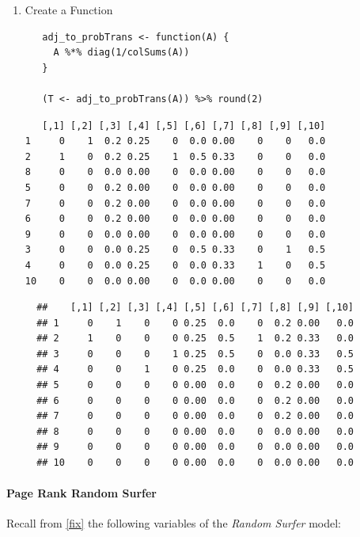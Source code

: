 \documentclass[11pt]{article}
\begin{document}
\begin{enumerate}
\item Create a Function
\label{create-a-function}
\lstset{language=r,label= ,caption= ,captionpos=b,numbers=none}
\begin{lstlisting}
   adj_to_probTrans <- function(A) {
     A %*% diag(1/colSums(A))
   }

   (T <- adj_to_probTrans(A)) %>% round(2)
\end{lstlisting}

\begin{verbatim}
   [,1] [,2] [,3] [,4] [,5] [,6] [,7] [,8] [,9] [,10]
1     0    1  0.2 0.25    0  0.0 0.00    0    0   0.0
2     1    0  0.2 0.25    1  0.5 0.33    0    0   0.0
8     0    0  0.0 0.00    0  0.0 0.00    0    0   0.0
5     0    0  0.2 0.00    0  0.0 0.00    0    0   0.0
7     0    0  0.2 0.00    0  0.0 0.00    0    0   0.0
6     0    0  0.2 0.00    0  0.0 0.00    0    0   0.0
9     0    0  0.0 0.00    0  0.0 0.00    0    0   0.0
3     0    0  0.0 0.25    0  0.5 0.33    0    1   0.5
4     0    0  0.0 0.25    0  0.0 0.33    1    0   0.5
10    0    0  0.0 0.00    0  0.0 0.00    0    0   0.0
\end{verbatim}

\begin{verbatim}
  ##    [,1] [,2] [,3] [,4] [,5] [,6] [,7] [,8] [,9] [,10]
  ## 1     0    1    0    0 0.25  0.0    0  0.2 0.00   0.0
  ## 2     1    0    0    0 0.25  0.5    1  0.2 0.33   0.0
  ## 3     0    0    0    1 0.25  0.5    0  0.0 0.33   0.5
  ## 4     0    0    1    0 0.25  0.0    0  0.0 0.33   0.5
  ## 5     0    0    0    0 0.00  0.0    0  0.2 0.00   0.0
  ## 6     0    0    0    0 0.00  0.0    0  0.2 0.00   0.0
  ## 7     0    0    0    0 0.00  0.0    0  0.2 0.00   0.0
  ## 8     0    0    0    0 0.00  0.0    0  0.0 0.00   0.0
  ## 9     0    0    0    0 0.00  0.0    0  0.0 0.00   0.0
  ## 10    0    0    0    0 0.00  0.0    0  0.0 0.00   0.0
\end{verbatim}
\end{enumerate}

\paragraph{Page Rank Random Surfer}
\label{page-rank-random-surfer}
Recall from \ref{fix} the following variables of the \emph{Random Surfer} model:
\end{document}
